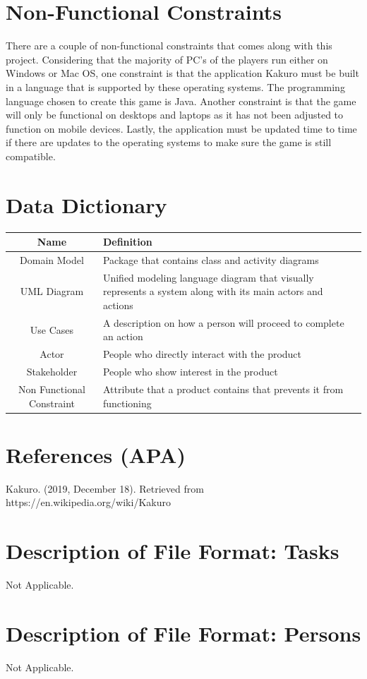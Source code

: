 \documentclass[12pt]{article}
\begin{document}
\newpage
\pagestyle{plain} 
\section{Non-Functional Constraints}
There are a couple of non-functional constraints that comes along with this project. Considering that the majority of PC’s of the players run either on Windows or Mac OS, one constraint is that the application Kakuro must be built in a language that is supported by these operating systems. The programming language chosen to create this game is Java. Another constraint is that the game will only be functional on desktops and laptops as it has not been adjusted to function on mobile devices. Lastly, the application must be updated time to time if there are updates to the operating systems to make sure the game is still compatible.\\

\newpage
\pagestyle{plain} 
\section{Data Dictionary}

\begin{table}[htbp]
\begin{tabular}{|c | m{10cm}|}
\hline
\cellcolor{gray}Name & \cellcolor{gray}Definition \\
\hline
Domain Model & Package that contains class and activity diagrams  \\
\hline
UML Diagram & Unified modeling language diagram that visually represents a system along with its main actors and actions \\
\hline
Use Cases & A description on how a person will proceed to complete an action \\
\hline
Actor & People who directly interact with the product \\
\hline
Stakeholder & People who show interest in the product\\
\hline
Non Functional Constraint & Attribute that a product contains that prevents it from functioning\\
\hline

\end{tabular}
\end{table}

\newpage
\pagestyle{plain}
\section{References (APA)}

Kakuro. (2019, December 18). Retrieved from https://en.wikipedia.org/wiki/Kakuro
\newpage
\pagestyle{plain} 
\appendix

\section{Description of File Format: Tasks}

Not Applicable.

\section{Description of File Format: Persons}

Not Applicable.
\end{document}
